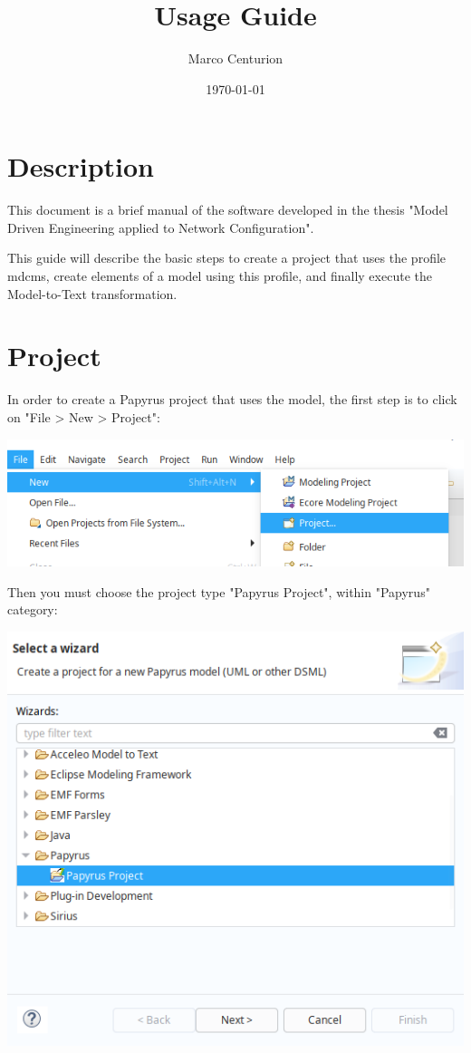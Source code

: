 \documentclass[11pt]{article}
\author{Marco Centurion}
\date{\today}
\title{Usage Guide}
\begin{document}
\maketitle
\tableofcontents


\section{Description}
\label{sec:org17588f2}

This document is a brief manual of the software developed in the thesis "Model Driven Engineering applied to Network Configuration".

This guide will describe the basic steps to create a project that uses the  profile mdcms, create elements of a model using this profile, and finally execute the Model-to-Text transformation.

\section{Project}
\label{sec:org66c8ddb}

In order to create a Papyrus project that uses the model, the first step is to click on "File > New > Project":

\begin{center}
\includegraphics[width=.9\linewidth]{images/project_1.png}
\end{center}

Then you must choose the project type "Papyrus Project", within "Papyrus" category:

\begin{center}
\includegraphics[width=.9\linewidth]{images/project_2.png}
\end{center}
\newpage
\end{document}
